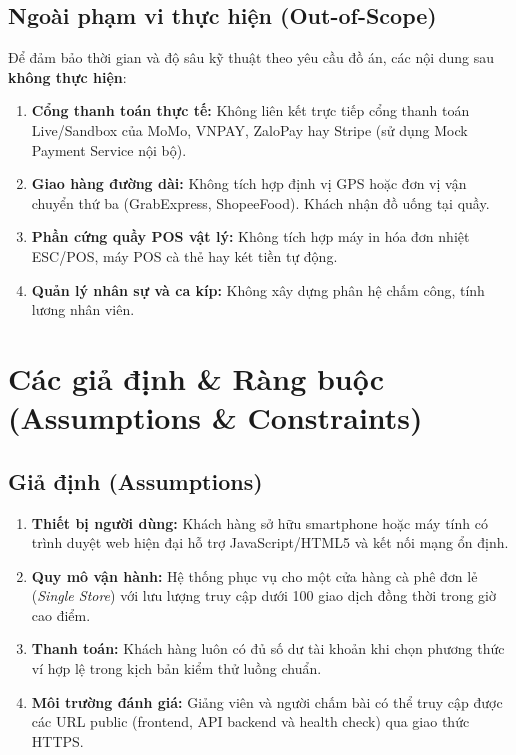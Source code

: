 \documentclass[12pt,a4paper]{article}
\begin{document}
\subsection{Ngoài phạm vi thực hiện (Out-of-Scope)}
Để đảm bảo thời gian và độ sâu kỹ thuật theo yêu cầu đồ án, các nội dung sau \textbf{không thực hiện}:
\begin{enumerate}[leftmargin=*,itemsep=1pt]
    \item \textbf{Cổng thanh toán thực tế:} Không liên kết trực tiếp cổng thanh toán Live/Sandbox của MoMo, VNPAY, ZaloPay hay Stripe (sử dụng Mock Payment Service nội bộ).
    \item \textbf{Giao hàng đường dài:} Không tích hợp định vị GPS hoặc đơn vị vận chuyển thứ ba (GrabExpress, ShopeeFood). Khách nhận đồ uống tại quầy.
    \item \textbf{Phần cứng quầy POS vật lý:} Không tích hợp máy in hóa đơn nhiệt ESC/POS, máy POS cà thẻ hay két tiền tự động.
    \item \textbf{Quản lý nhân sự và ca kíp:} Không xây dựng phân hệ chấm công, tính lương nhân viên.
\end{enumerate}

\newpage

\section{Các giả định \& Ràng buộc (Assumptions \& Constraints)}

\subsection{Giả định (Assumptions)}
\begin{enumerate}[leftmargin=*,itemsep=2pt]
    \item \textbf{Thiết bị người dùng:} Khách hàng sở hữu smartphone hoặc máy tính có trình duyệt web hiện đại hỗ trợ JavaScript/HTML5 và kết nối mạng ổn định.
    \item \textbf{Quy mô vận hành:} Hệ thống phục vụ cho một cửa hàng cà phê đơn lẻ (\textit{Single Store}) với lưu lượng truy cập dưới 100 giao dịch đồng thời trong giờ cao điểm.
    \item \textbf{Thanh toán:} Khách hàng luôn có đủ số dư tài khoản khi chọn phương thức ví hợp lệ trong kịch bản kiểm thử luồng chuẩn.
    \item \textbf{Môi trường đánh giá:} Giảng viên và người chấm bài có thể truy cập được các URL public (frontend, API backend và health check) qua giao thức HTTPS.
\end{enumerate}
\end{document}
